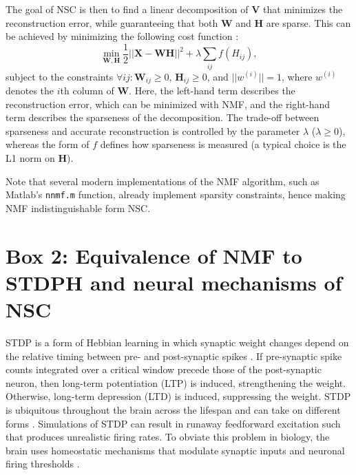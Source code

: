 The goal of \ac{NSC} is then to find a linear decomposition of \textbf{V}
that minimizes the reconstruction error,
while guaranteeing that both \textbf{W} and \textbf{H} are sparse.
This can be achieved by minimizing the following cost function
\citep{Hoyer2002}:
\begin{equation}
\min_{\mathbf{W}, \mathbf{H}} \frac{1}{2} ||\mathbf{X} -\mathbf{WH}||^2 + \lambda \sum_{ij} f(H_{ij}),
\end{equation}
subject to the constraints
$\forall ij: \mathbf{W}_{ij} \geq 0$, $\mathbf{H}_{ij} \geq 0$, and
$||w^{(i)}|| = 1$, where $w^{(i)}$ denotes the $i$th column of \textbf{W}.
Here, the left-hand term describes the reconstruction error, which can
be minimized with \ac{NMF},
and the right-hand term describes the sparseness of the decomposition.
The trade-off between sparseness and accurate reconstruction
is controlled by the parameter $\lambda$ ($\lambda \geq 0$), whereas
the form of $f$ defines how sparseness is measured
(a typical choice is the L1 norm on \textbf{H}).

Note that several modern implementations of the \ac{NMF} algorithm,
such as Matlab's \texttt{nnmf.m} function,
already implement sparsity constraints,
hence making \ac{NMF} indistinguishable form \ac{NSC}.



\section{Box 2: Equivalence of NMF to STDPH and neural mechanisms of NSC}
\label{Box:NMFvSTDPH}

\Acf{STDP} is a form of Hebbian learning in which synaptic weight changes
depend on the relative timing between pre- and post-synaptic spikes \citep{BiPoo1998,SongAbbott2000}. If pre-synaptic spike counts integrated over a critical window precede those of the post-synaptic neuron, then long-term potentiation (LTP) is induced, strengthening the weight. Otherwise, long-term depression (LTD) is induced, suppressing the weight. STDP is ubiquitous throughout the brain across the lifespan and can take on different forms \citep{Caporale2008STDP,Holtmaat2009STDP}. Simulations of \ac{STDP} can result in runaway feedforward excitation such that produces unrealistic firing rates. To obviate this problem in biology, the brain uses homeostatic mechanisms that modulate synaptic inputs and neuronal firing thresholds \citep{Watt2010}.

